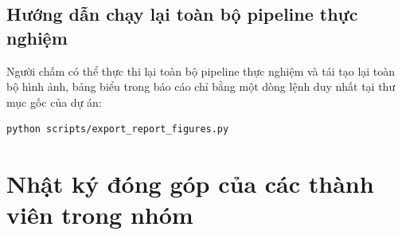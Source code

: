 \documentclass[12pt,a4paper,oneside,openany]{report}
\begin{document}
\section{Hướng dẫn chạy lại toàn bộ pipeline thực nghiệm}
Người chấm có thể thực thi lại toàn bộ pipeline thực nghiệm và tái tạo lại toàn bộ hình ảnh, bảng biểu trong báo cáo chỉ bằng một dòng lệnh duy nhất tại thư mục gốc của dự án:
\begin{lstlisting}[language=bash,numbers=none]
python scripts/export_report_figures.py
\end{lstlisting}

\chapter{Nhật ký đóng góp của các thành viên trong nhóm}
\label{pl:nhatky}
\end{document}
